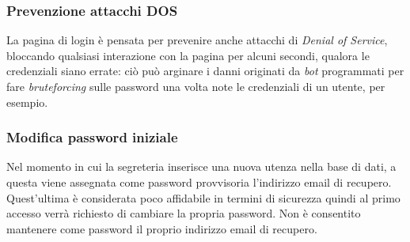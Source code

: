 \documentclass{article}
\begin{document}
\subsubsection{Prevenzione attacchi DOS}
La pagina di login è pensata per prevenire anche attacchi di \textit{Denial of Service}, bloccando qualsiasi interazione con la pagina per alcuni secondi, qualora le credenziali siano errate: ciò può arginare i danni originati da \textit{bot} programmati per fare \textit{bruteforcing} sulle password una volta note le credenziali di un utente, per esempio.
\subsubsection{Modifica password iniziale}
Nel momento in cui la segreteria inserisce una nuova utenza nella base di dati, a questa viene assegnata come password provvisoria l'indirizzo email di recupero. Quest'ultima è considerata poco affidabile in termini di sicurezza quindi al primo accesso verrà richiesto di cambiare la propria password. Non è consentito mantenere come password il proprio indirizzo email di recupero.
\end{document}
